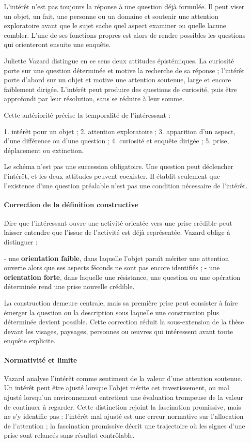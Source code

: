 \documentclass[10pt,a4paper]{article}
\begin{document}
L'intérêt n'est pas toujours la réponse à une question déjà formulée. Il peut viser un objet, un fait, une personne ou un domaine et soutenir une attention exploratoire avant que le sujet sache quel aspect examiner ou quelle lacune combler. L'une de ses fonctions propres est alors de rendre possibles les questions qui orienteront ensuite une enquête.

Juliette Vazard distingue en ce sens deux attitudes épistémiques. La curiosité porte sur une question déterminée et motive la recherche de sa réponse ; l'intérêt porte d'abord sur un objet et motive une attention soutenue, large et encore faiblement dirigée. L'intérêt peut produire des questions de curiosité, puis être approfondi par leur résolution, sans se réduire à leur somme.

Cette antériorité précise la temporalité de l'intéressant :

1. intérêt pour un objet ; 2. attention exploratoire ; 3. apparition d'un aspect, d'une différence ou d'une question ; 4. curiosité et enquête dirigée ; 5. prise, déplacement ou extinction.

Le schéma n'est pas une succession obligatoire. Une question peut déclencher l'intérêt, et les deux attitudes peuvent coexister. Il établit seulement que l'existence d'une question préalable n'est pas une condition nécessaire de l'intérêt.

\paragraph{Correction de la définition constructive}
Dire que l'intéressant ouvre une activité orientée vers une prise crédible peut laisser entendre que l'issue de l'activité est déjà représentée. Vazard oblige à distinguer :

- une \textbf{orientation faible}, dans laquelle l'objet paraît mériter une attention   ouverte alors que ses aspects féconds ne sont pas encore identifiés ; - une \textbf{orientation forte}, dans laquelle une résistance, une question ou une   opération déterminée rend une prise nouvelle crédible.

La construction demeure centrale, mais sa première prise peut consister à faire émerger la question ou la description sous laquelle une construction plus déterminée devient possible. Cette correction réduit la sous-extension de la thèse devant les visages, paysages, personnes ou œuvres qui intéressent avant toute enquête explicite.

\paragraph{Normativité et limite}
Vazard analyse l'intérêt comme sentiment de la valeur d'une attention soutenue. Un intérêt peut être ajusté lorsque l'objet mérite cet investissement, ou mal ajusté lorsqu'un environnement entretient une évaluation trompeuse de la valeur de continuer à regarder. Cette distinction rejoint la fascination promissive, mais ne s'y identifie pas : l'intérêt mal ajusté est une erreur normative sur l'allocation de l'attention ; la fascination promissive décrit une trajectoire où les signes d'une prise sont relancés sans résultat contrôlable.
\end{document}
